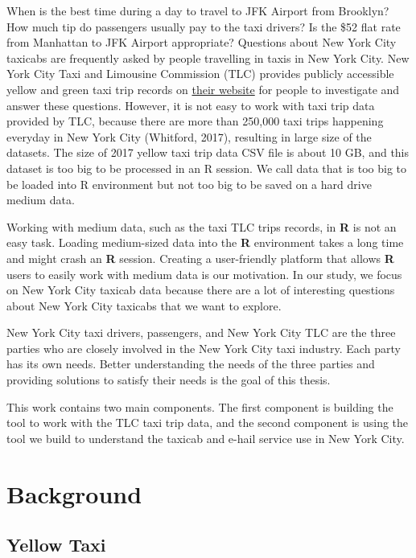 \documentclass[12pt,twoside]{reedthesis}
\theoremstyle{definition}
\theoremstyle{definition}
\theoremstyle{definition}
\theoremstyle{remark}
\begin{document}
When is the best time during a day to travel to JFK Airport from
Brooklyn? How much tip do passengers usually pay to the taxi drivers? Is
the \$52 flat rate from Manhattan to JFK Airport appropriate? Questions
about New York City taxicabs are frequently asked by people travelling
in taxis in New York City. New York City Taxi and Limousine Commission
(TLC) provides publicly accessible yellow and green taxi trip records on
\href{http://www.nyc.gov/html/tlc/html/about/trip_record_data.shtml}{their
website} for people to investigate and answer these questions. However,
it is not easy to work with taxi trip data provided by TLC, because
there are more than 250,000 taxi trips happening everyday in New York
City (Whitford, 2017), resulting in large size of the datasets. The size
of 2017 yellow taxi trip data CSV file is about 10 GB, and this dataset
is too big to be processed in an R session. We call data that is too big
to be loaded into R environment but not too big to be saved on a hard
drive medium data.

Working with medium data, such as the taxi TLC trips records, in
\textbf{R} is not an easy task. Loading medium-sized data into the
\textbf{R} environment takes a long time and might crash an \textbf{R}
session. Creating a user-friendly platform that allows \textbf{R} users
to easily work with medium data is our motivation. In our study, we
focus on New York City taxicab data because there are a lot of
interesting questions about New York City taxicabs that we want to
explore.

New York City taxi drivers, passengers, and New York City TLC are the
three parties who are closely involved in the New York City taxi
industry. Each party has its own needs. Better understanding the needs
of the three parties and providing solutions to satisfy their needs is
the goal of this thesis.

This work contains two main components. The first component is building
the tool to work with the TLC taxi trip data, and the second component
is using the tool we build to understand the taxicab and e-hail service
use in New York City.

\section{Background}\label{background}

\subsection{Yellow Taxi}\label{yellow-taxi}
\end{document}
